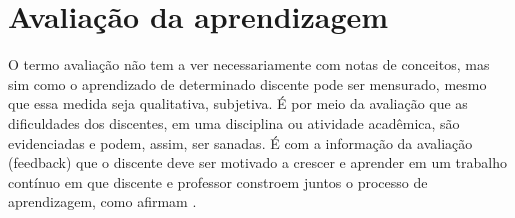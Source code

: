 \documentclass[
	12pt,				%
	openright,			%
	oneside,			%
	a4paper,			%
	english,			%
	brazil				%
	]{abntex2}
\begin{document}

\chapter{Avaliação da aprendizagem}
\label{cap:06} 
%
O termo avaliação não tem a ver necessariamente com notas de conceitos, mas sim como o aprendizado de determinado discente pode ser mensurado, mesmo que essa medida seja qualitativa, subjetiva. É por meio da avaliação que as dificuldades dos discentes, em uma disciplina ou atividade acadêmica, são evidenciadas e podem, assim, ser sanadas. É com a informação da avaliação (feedback) que o discente deve ser motivado a crescer e aprender em um trabalho contínuo em que discente e professor constroem juntos o processo de aprendizagem, como afirmam \textcite{gaeta}.
\end{document}
